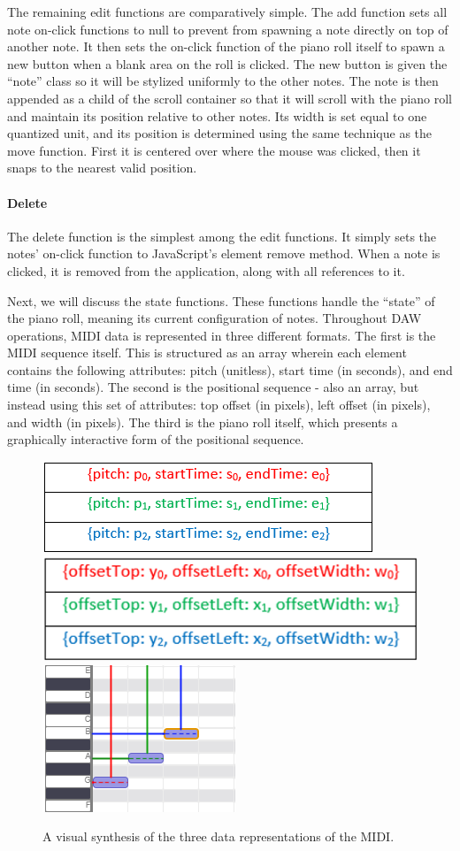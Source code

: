 The remaining edit functions are comparatively simple. The add function sets all note on-click
functions to null to prevent from spawning a note directly on top of another note. It then sets the
on-click function of the piano roll itself to spawn a new button when a blank area on the roll is
clicked. The new button is given the “note” class so it will be stylized uniformly to the other
notes. The note is then appended as a child of the scroll container so that it will scroll with the
piano roll and maintain its position relative to other notes. Its width is set equal to one
quantized unit, and its position is determined using the same technique as the move function. First
it is centered over where the mouse was clicked, then it snaps to the nearest valid position.

\paragraph{Delete}

The delete function is the simplest among the edit functions. It simply sets the notes’ on-click
function to JavaScript’s element remove method. When a note is clicked, it is removed from the
application, along with all references to it.

Next, we will discuss the state functions. These functions handle the “state” of the piano roll,
meaning its current configuration of notes. Throughout DAW operations, MIDI data is represented in
three different formats. The first is the MIDI sequence itself. This is structured as an array
wherein each element contains the following attributes: pitch (unitless), start time (in seconds),
and end time (in seconds). The second is the positional sequence - also an array, but instead using
this set of attributes: top offset (in pixels), left offset (in pixels), and width (in pixels). The
third is the piano roll itself, which presents a graphically interactive form of the positional
sequence.

\begin{figure}[h!]
  \centering
  \includegraphics[width=0.35 \linewidth]{image/MIDIState.png}
  \includegraphics[width=0.35 \linewidth]{image/PositionState.png}
  \includegraphics[width=0.2 \linewidth]{image/RollState.png}
  \caption{A visual synthesis of the three data representations of the MIDI.}
  \label{fig:states}
\end{figure}

